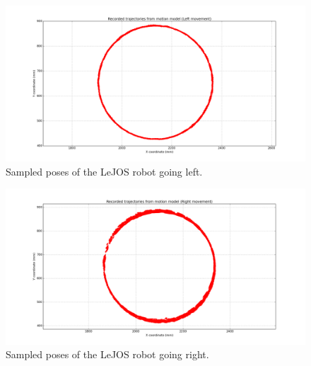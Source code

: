 \documentclass[paper=a4, fontsize=11pt]{scrartcl} %
\begin{document}
    \begin{figure}[H]
        \begin{center}
            \setlength{\fboxsep}{0.5pt} %
            \setlength{\fboxrule}{0.5pt}
            \includegraphics[width=\linewidth,fbox]{images/raw_left.png}
            \caption{Sampled poses of the LeJOS robot going left.}
        \end{center}
    \end{figure}

    \begin{figure}[H]
        \begin{center}
            \setlength{\fboxsep}{0.5pt} %
            \setlength{\fboxrule}{0.5pt}
            \includegraphics[width=\linewidth,fbox]{images/raw_right.png}
            \caption{Sampled poses of the LeJOS robot going right.}
        \end{center}
    \end{figure}
\end{document}
